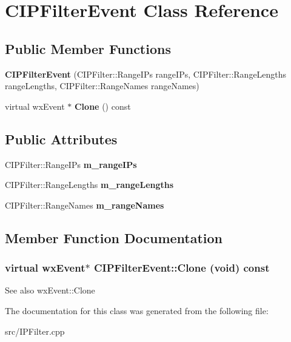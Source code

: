 \section{CIPFilterEvent Class Reference}
\label{classCIPFilterEvent}
\subsection*{Public Member Functions}
\begin{DoxyCompactItemize}
\item 
{\bfseries CIPFilterEvent} (CIPFilter::RangeIPs rangeIPs, CIPFilter::RangeLengths rangeLengths, CIPFilter::RangeNames rangeNames)\label{classCIPFilterEvent_a486d57545aab96b8e3c1a387c344bc5f}

\item 
virtual wxEvent $\ast$ {\bf Clone} () const 
\end{DoxyCompactItemize}
\subsection*{Public Attributes}
\begin{DoxyCompactItemize}
\item 
CIPFilter::RangeIPs {\bfseries m\_\-rangeIPs}\label{classCIPFilterEvent_a37ff208947b56341ba88f5b2fac7618d}

\item 
CIPFilter::RangeLengths {\bfseries m\_\-rangeLengths}\label{classCIPFilterEvent_a40d6fac570f23499efdbdae339462e31}

\item 
CIPFilter::RangeNames {\bfseries m\_\-rangeNames}\label{classCIPFilterEvent_ab34584f30fc504a6895db0f4724cd61f}

\end{DoxyCompactItemize}


\subsection{Member Function Documentation}
\subsubsection[{Clone}]{\setlength{\rightskip}{0pt plus 5cm}virtual wxEvent$\ast$ CIPFilterEvent::Clone (void) const\hspace{0.3cm}{\ttfamily  [inline, virtual]}}\label{classCIPFilterEvent_a33f4371fc269244dc5329c76de68fc23}
\begin{DoxySeeAlso}{See also}
wxEvent::Clone 
\end{DoxySeeAlso}


The documentation for this class was generated from the following file:\begin{DoxyCompactItemize}
\item 
src/IPFilter.cpp\end{DoxyCompactItemize}
